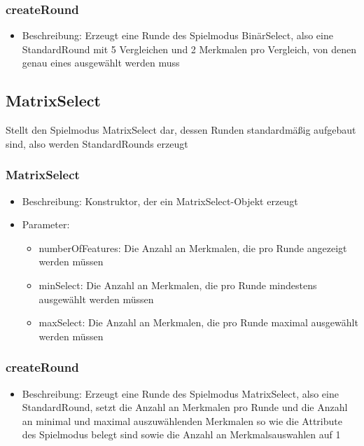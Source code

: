 \documentclass[a4paper]{scrreprt}
\begin{document}
    \subsubsection{createRound}
    \begin{itemize}
        \item Beschreibung: Erzeugt eine Runde des Spielmodus BinärSelect, also eine StandardRound mit 5 Vergleichen und 2 Merkmalen pro Vergleich, von denen genau eines ausgewählt werden muss
    \end{itemize}

    \subsection{MatrixSelect}
    Stellt den Spielmodus MatrixSelect dar, dessen Runden standardmäßig aufgebaut sind, also werden StandardRounds erzeugt
    \subsubsection{MatrixSelect}
    \begin{itemize}
        \item Beschreibung: Konstruktor, der ein MatrixSelect-Objekt erzeugt
        \item Parameter:
        \begin{itemize}
            \item numberOfFeatures: Die Anzahl an Merkmalen, die pro Runde angezeigt werden müssen
            \item minSelect: Die Anzahl an Merkmalen, die pro Runde mindestens ausgewählt werden müssen
            \item maxSelect: Die Anzahl an Merkmalen, die pro Runde maximal ausgewählt werden müssen
        \end{itemize}
    \end{itemize}
    \subsubsection{createRound}
    \begin{itemize}
        \item Beschreibung: Erzeugt eine Runde des Spielmodus MatrixSelect, also eine StandardRound, setzt die Anzahl an Merkmalen pro Runde und die Anzahl an minimal und maximal auszuwählenden Merkmalen so wie die Attribute des Spielmodus belegt sind sowie die Anzahl an Merkmalsauswahlen auf 1
    \end{itemize}
\end{document}
